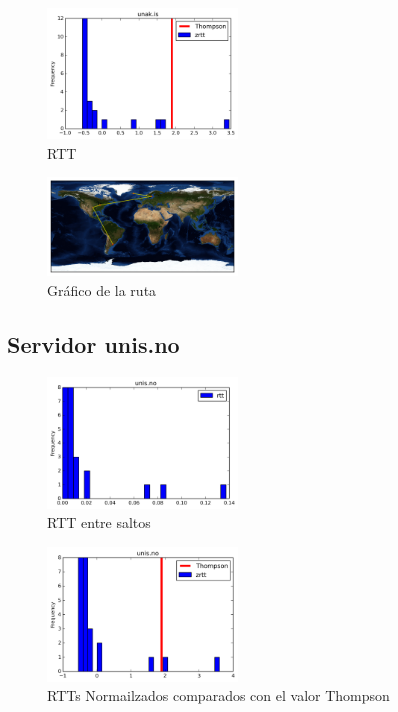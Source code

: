 \begin{figure}[H]
  \centering
    \includegraphics[width=0.45\textwidth]{histogramas_thompson/unak-is.png}
  \caption{RTT }
  \label{entropia-s}
\end{figure}

\begin{figure}[H]
  \centering
    \includegraphics[width=0.45\textwidth]{grafico-rutas/unak-is.png}
  \caption{Gráfico de la ruta}
  \label{entropia-s}
\end{figure}




\subsection{Servidor unis.no}
\begin{figure}[H]
  \centering
    \includegraphics[width=0.45\textwidth]{histogramas_rtt/unis-no.png}
  \caption{RTT entre saltos}
  \label{entropia-s}
\end{figure}

\begin{figure}[H]
  \centering
    \includegraphics[width=0.45\textwidth]{histogramas_thompson/unis-no.png}
  \caption{RTTs Normailzados comparados con el valor Thompson}
  \label{entropia-s}
\end{figure}

